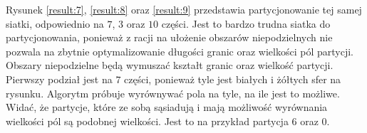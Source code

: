 Rysunek \ref{result:7}, \ref{result:8} oraz \ref{result:9} przedstawia partycjonowanie tej samej siatki, odpowiednio na
$7$, $3$ oraz $10$ części.
Jest to bardzo trudna siatka do partycjonowania, ponieważ z racji na ułożenie obszarów niepodzielnych
nie pozwala na zbytnie optymalizowanie długości granic oraz wielkości pól partycji.
Obszary niepodzielne będą wymuszać kształt granic oraz wielkość partycji.
Pierwszy podział jest na $7$ części, ponieważ tyle jest białych i żółtych sfer na rysunku.
Algorytm próbuje wyrównywać pola na tyle, na ile jest to możliwe.
Widać, że partycje, które ze sobą sąsiadują i mają możliwość wyrównania wielkości pól są podobnej wielkości.
Jest to na przykład partycja $6$ oraz $0$.
\begin{figure}[h]
\centering
\begin{subfigure}{.33\textwidth}
    \centering
    \caption[short]{}
\end{subfigure}%
\begin{subfigure}{.33\textwidth}
    \centering

\end{subfigure}
\end{figure}
